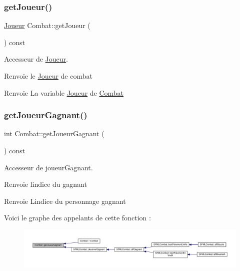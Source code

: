\subsubsection{\texorpdfstring{get\+Joueur()}{getJoueur()}}
{\footnotesize\ttfamily \hyperlink{class_joueur}{Joueur} Combat\+::get\+Joueur (\begin{DoxyParamCaption}{ }\end{DoxyParamCaption}) const}



Accesseur de \hyperlink{class_joueur}{Joueur}. 

Renvoie le \hyperlink{class_joueur}{Joueur} de combat \begin{DoxyReturn}{Renvoie}
La variable \hyperlink{class_joueur}{Joueur} de \hyperlink{class_combat}{Combat} 
\end{DoxyReturn}
\mbox{\label{class_combat_a7faa6a3b11778224b04524db1418d67f}} 
\subsubsection{\texorpdfstring{get\+Joueur\+Gagnant()}{getJoueurGagnant()}}
{\footnotesize\ttfamily int Combat\+::get\+Joueur\+Gagnant (\begin{DoxyParamCaption}{ }\end{DoxyParamCaption}) const}



Accesseur de joueur\+Gagnant. 

Renvoie l\textquotesingle{}indice du gagnant \begin{DoxyReturn}{Renvoie}
L\textquotesingle{}indice du personnage gagnant 
\end{DoxyReturn}
Voici le graphe des appelants de cette fonction \+:\nopagebreak
\begin{figure}[H]
\begin{center}
\leavevmode
\includegraphics[width=350pt]{class_combat_a7faa6a3b11778224b04524db1418d67f_icgraph}
\end{center}
\end{figure}
\mbox{\label{class_combat_af72bd31264a8cdeeb3f3f8c30c727d33}} 
